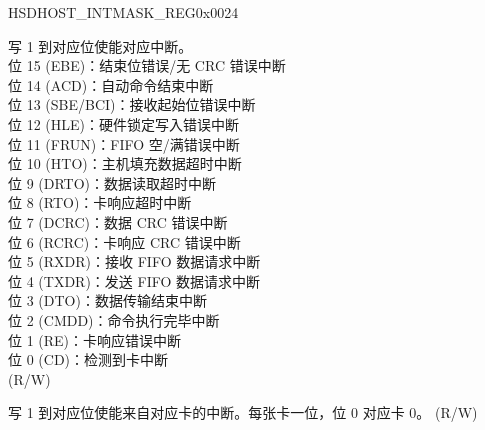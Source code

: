 \begin{register}{H}{SDHOST\_INTMASK\_REG}{0x0024}\label{regdesc:SDHOSTINTMASKREG}
%
%
%
\regnewline%
\begin{regdesc}\begin{reglist}
\label{fielddesc:SDHOSTINTMASK}\item [SDHOST\_INT\_MASK] 写 1 到对应位使能对应中断。\\
位 15 (EBE)：结束位错误/无 CRC 错误中断\\
位 14 (ACD)：自动命令结束中断\\
位 13 (SBE/BCI)：接收起始位错误中断\\
位 12 (HLE)：硬件锁定写入错误中断\\
位 11 (FRUN)：FIFO 空/满错误中断\\
位 10 (HTO)：主机填充数据超时中断\\
位 9 (DRTO)：数据读取超时中断\\
位 8 (RTO)：卡响应超时中断\\
位 7 (DCRC)：数据 CRC 错误中断\\
位 6 (RCRC)：卡响应 CRC 错误中断\\
位 5 (RXDR)：接收 FIFO 数据请求中断\\
位 4 (TXDR)：发送 FIFO 数据请求中断\\
位 3 (DTO)：数据传输结束中断\\
位 2 (CMDD)：命令执行完毕中断\\
位 1 (RE)：卡响应错误中断\\
位 0 (CD)：检测到卡中断\\  (R/W)
\label{fielddesc:SDHOSTSDIOINTMASK}\item [SDHOST\_SDIO\_INT\_MASK] 写 1 到对应位使能来自对应卡的中断。每张卡一位，位 0 对应卡 0。  (R/W)
\end{reglist}\end{regdesc}
\end{register}



